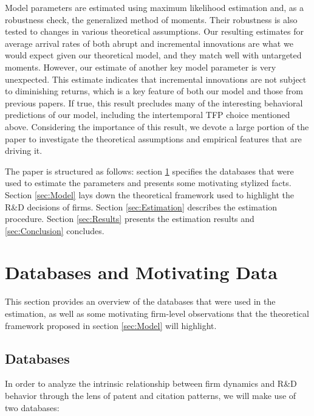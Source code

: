 \documentclass[letterpaper,12pt]{article}
\theoremstyle{definition}
\begin{document}
Model parameters are estimated using maximum likelihood estimation and, as a robustness check, the generalized method of moments. Their robustness is also tested to changes in various theoretical assumptions. Our resulting estimates for average arrival rates of both abrupt and incremental innovations are what we would expect given our theoretical model, and they match well with untargeted moments. However, our estimate of another key model parameter is very unexpected. This estimate indicates that incremental innovations are not subject to diminishing returns, which is a key feature of both our model and those from previous papers. If true, this result precludes many of the interesting behavioral predictions of our model, including the intertemporal TFP choice mentioned above. Considering the importance of this result, we devote a large portion of the paper to investigate the theoretical assumptions and empirical features that are driving it.

The paper is structured as follows: section \ref{sec:Data} specifies the databases that were used to estimate the parameters and presents some motivating stylized facts. Section \ref{sec:Model} lays down the theoretical framework used to highlight the R\&D decisions of firms. Section \ref{sec:Estimation} describes the estimation procedure. Section \ref{sec:Results} presents the estimation results and \ref{sec:Conclusion} concludes.

\section{Databases and Motivating Data}\label{sec:Data}

This section provides an overview of the databases that were used in the estimation, as well as some motivating firm-level observations that the theoretical framework proposed in section \ref{sec:Model} will highlight.

\subsection{Databases}

In order to analyze the intrinsic relationship between firm dynamics and R\&D behavior through the lens of patent and citation patterns, we will make use of two databases:
\end{document}
